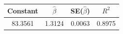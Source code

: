 \begin{tabular}{cccc}
\toprule
Constant & $\hat{\beta}$ & SE($\hat{\beta}$) & $R^2$ \\
\midrule
83.3561 & 1.3124 & 0.0063 & 0.8975 \\
\bottomrule
\end{tabular}